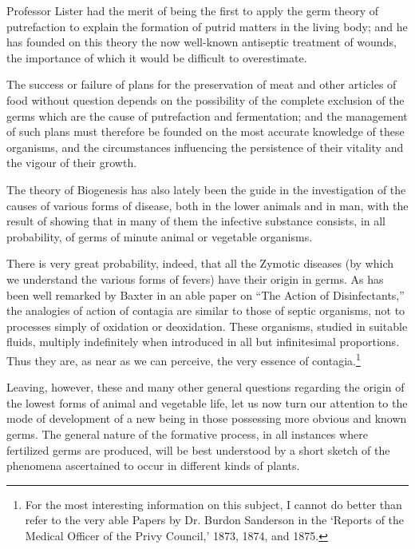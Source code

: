 \documentclass[a4paper, 11pt, oneside, english]{article}
\begin{document}
Professor Lister had the merit of being the first to apply the germ theory of putrefaction to explain the formation of putrid matters in the living body; and he has founded on this theory the now well-known antiseptic treatment of wounds, the importance of which it would be difficult to overestimate.

The success or failure of plans for the preservation of meat and other articles of food without question depends on the possibility of the complete exclusion of the germs which are the cause of putrefaction and fermentation; and the management of such plans must therefore be founded on the most accurate knowledge of these organisms, and the circumstances influencing the persistence of their vitality and the vigour of their growth.

The theory of Biogenesis has also lately been the guide in the investigation of the causes of various forms of disease, both in the lower animals and in man, with the result of showing that in many of them the infective substance consists, in all probability, of germs of minute animal or vegetable organisms.

There is very great probability, indeed, that all the Zymotic diseases (by which we understand the various forms of fevers) have their origin in germs. As has been well remarked by Baxter in an able paper on ``The Action of Disinfectants,'' the analogies of action of contagia are similar to those of septic organisms, not to processes simply of oxidation or deoxidation. These organisms, studied in suitable fluids, multiply indefinitely when introduced in all but infinitesimal proportions. Thus they are, as near as we can perceive, the very essence of contagia.\footnote{For the most interesting information on this subject, I cannot do better than refer to the very able Papers by Dr. Burdon Sanderson in the `Reports of the Medical Officer of the Privy Council,' 1873, 1874, and 1875.}

Leaving, however, these and many other general questions regarding the origin of the lowest forms of animal and vegetable life, let us now turn our attention to the mode of development of a new being in those possessing more obvious and known germs. The general nature of the formative process, in all instances where fertilized germs are produced, will be best understood by a short sketch of the phenomena ascertained to occur in different kinds of plants.
\end{document}
